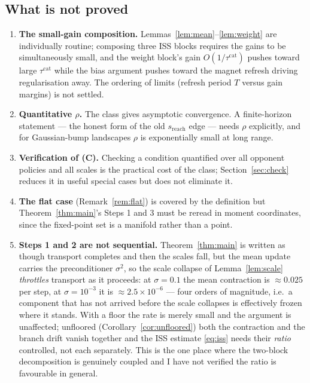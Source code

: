\documentclass[11pt]{article}
\theoremstyle{definition}
\begin{document}
\subsection{What is not proved}\label{sec:gaps}

\begin{enumerate}
\item \textbf{The small-gain composition.} Lemmas~\ref{lem:mean}--\ref{lem:weight}
  are individually routine; composing three ISS blocks requires the gains to be
  simultaneously small, and the weight block's gain $O(1/\tau^{\mathrm{cat}})$
  pushes toward large $\tau^{\mathrm{cat}}$ while the bias argument pushes toward
  the magnet refresh driving regularisation away. The ordering of limits
  (refresh period $T$ versus gain margins) is not settled.
\item \textbf{Quantitative $\rho$.} The class gives asymptotic convergence. A
  finite-horizon statement --- the honest form of the old $s_{\mathrm{reach}}$
  edge --- needs $\rho$ explicitly, and for Gaussian-bump landscapes $\rho$ is
  exponentially small at long range.
\item \textbf{Verification of (C).} Checking a condition quantified over all
  opponent policies and all scales is the practical cost of the class;
  Section~\ref{sec:check} reduces it in useful special cases but does not
  eliminate it.
\item \textbf{The flat case} (Remark~\ref{rem:flat}) is covered by the definition
  but Theorem~\ref{thm:main}'s Steps 1 and 3 must be reread in moment
  coordinates, since the fixed-point set is a manifold rather than a point.
\item \textbf{Steps 1 and 2 are not sequential.} Theorem~\ref{thm:main} is
  written as though transport completes and then the scales fall, but the mean
  update carries the preconditioner $\sigma^2$, so the scale collapse of
  Lemma~\ref{lem:scale} \emph{throttles} transport as it proceeds: at
  $\sigma = 0.1$ the mean contraction is $\approx 0.025$ per step, at
  $\sigma = 10^{-3}$ it is $\approx 2.5 \times 10^{-6}$ --- four orders of
  magnitude, i.e.\ a component that has not arrived before the scale collapses is
  effectively frozen where it stands. With a floor the rate is merely small and
  the argument is unaffected; unfloored (Corollary~\ref{cor:unfloored}) both the
  contraction and the branch drift vanish together and the ISS estimate
  \eqref{eq:iss} needs their \emph{ratio} controlled, not each separately. This
  is the one place where the two-block decomposition is genuinely coupled and I
  have not verified the ratio is favourable in general.
\end{enumerate}
\end{document}
